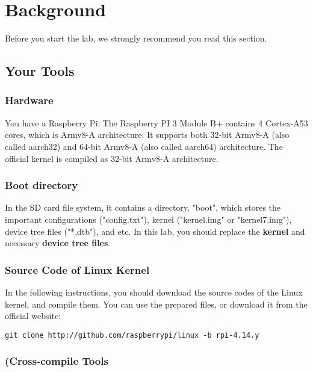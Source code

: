\section{Background}
\label{sec:background}

Before you start the lab, we strongly recommend you read this section. 

\subsection{Your Tools}


\subsubsection{Hardware}

You have a Raspberry Pi.
The Raspberry PI 3 Module B+ contains 4 Cortex-A53 cores, which is Armv8-A architecture.
It supports both 32-bit Armv8-A (also called aarch32) and 64-bit Armv8-A (also called aarch64) architecture.
The official kernel is compiled as 32-bit Armv8-A architecture.

\subsubsection{Boot directory}

In the SD card file system, it contains a directory, "boot", which stores the important configurations ("config.txt"), kernel ("kernel.img" or "kernel7.img"), device tree files ("*.dtb"), and etc.
In this lab, you should replace the \textbf{kernel} and necessary 
\textbf{device tree files}. 

\subsubsection{Source Code of Linux Kernel}

In the following instructions, you should download the source codes of the Linux kernel, and compile them.
You can use the prepared files, or download it from the official 
website:

\begin{lstlisting}
git clone http://github.com/raspberrypi/linux -b rpi-4.14.y
\end{lstlisting}

\subsubsection{(Cross-compile Tools}

